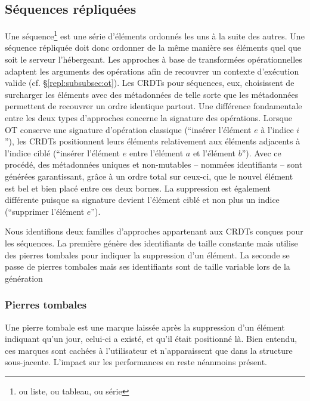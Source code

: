 \subsection{Séquences répliquées}
\label{repl:subsec:sequences}

Une séquence\footnote{ou liste, ou tableau, ou série} est une série d'éléments
ordonnés les uns à la suite des autres. Une séquence répliquée doit donc
ordonner de la même manière ses éléments quel que soit le serveur
l'hébergeant. Les approches à base de transformées opérationnelles adaptent les
arguments des opérations afin de recouvrer un contexte d'exécution valide
(cf. §\ref{repl:subsubsec:ot}). Les CRDTs pour séquences, eux, choisissent de
surcharger les éléments avec des métadonnées de telle sorte que les métadonnées
permettent de recouvrer un ordre identique partout. Une différence fondamentale
entre les deux types d'approches concerne la signature des opérations. Lorsque
OT conserve une signature d'opération classique (``insérer l'élément $e$ à
l'indice $i$''), les CRDTs positionnent leurs éléments relativement aux éléments
adjacents à l'indice ciblé (``insérer l'élément $e$ entre l'élément $a$ et
l'élément $b$''). Avec ce procédé, des métadonnées uniques et non-mutables --
nommées identifiants -- sont générées garantissant, grâce à un ordre total sur
ceux-ci, que le nouvel élément est bel et bien placé entre ces deux bornes. La
suppression est également différente puisque sa signature devient l'élément
ciblé et non plus un indice (``supprimer l'élément $e$'').

Nous identifions deux familles d'approches appartenant aux CRDTs conçues pour
les séquences. La première génère des identifiants de taille constante mais
utilise des pierres tombales pour indiquer la suppression d'un élément. La
seconde se passe de pierres tombales mais ses identifiants sont de taille
variable lors de la génération

\subsubsection{Pierres tombales}

Une pierre tombale est une marque laissée après la suppression d'un élément
indiquant qu'un jour, celui-ci a existé, et qu'il était positionné là. Bien
entendu, ces marques sont cachées à l'utilisateur et n'apparaissent que dans la
structure sous-jacente. L'impact sur les performances en reste néanmoins
présent.

